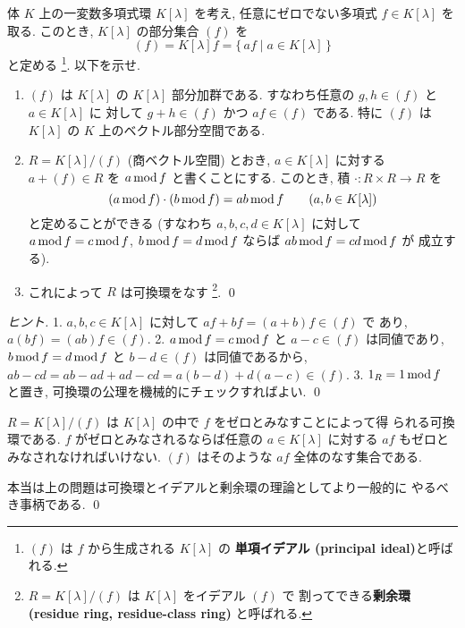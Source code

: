 \documentclass[12pt,twoside]{jarticle}
\begin{document}
\begin{question}[15点]
  \label{q:K[x]/(f)-1}
  体 $K$ 上の一変数多項式環 $K[\lambda]$ を考え, 
  任意にゼロでない多項式 $f\in K[\lambda]$ を取る.
  このとき, $K[\lambda]$ の部分集合 $(f)$ を
  \begin{equation*}
    (f) = K[\lambda]f = \{\, af \mid a\in K[\lambda]\,\}
  \end{equation*}
  と定める%
  \footnote{$(f)$ は $f$ から生成される $K[\lambda]$ の
    {\bf 単項イデアル (principal ideal)}と呼ばれる.}.  
  以下を示せ.
  \begin{enumerate}
  \item $(f)$ は $K[\lambda]$ の $K[\lambda]$ 部分加群である.
    すなわち任意の $g,h\in (f)$ と $a\in K[\lambda]$ に
    対して $g+h\in (f)$ かつ $af\in (f)$ である.
    特に $(f)$ は $K[\lambda]$ の $K$ 上のベクトル部分空間である.
  \item $R=K[\lambda]/(f)$ (商ベクトル空間) とおき,
    $a\in K[\lambda]$ に対する $a+(f)\in R$ を $a\mathop{\mathrm{mod}}\nolimits f$ と書くことにする.
    このとき, 積 $\cdot:R\times R\to R$ を
    \begin{equation*}
      (a\mathop{\mathrm{mod}}\nolimits f)\cdot(b\mathop{\mathrm{mod}}\nolimits f) = ab\mathop{\mathrm{mod}}\nolimits f
      \qquad (a,b\in K[\lambda])
    \end{equation*}
    と定めることができる
    (すなわち $a,b,c,d\in K[\lambda]$ に対して %
    $a\mathop{\mathrm{mod}}\nolimits f=c\mathop{\mathrm{mod}}\nolimits f$, $b\mathop{\mathrm{mod}}\nolimits f=d\mathop{\mathrm{mod}}\nolimits f$ ならば $ab\mathop{\mathrm{mod}}\nolimits f=cd\mathop{\mathrm{mod}}\nolimits f$ が
    成立する).
  \item これによって $R$ は可換環をなす%
    \footnote{$R=K[\lambda]/(f)$ は $K[\lambda]$ をイデアル $(f)$ で
      割ってできる{\bf 剰余環 (residue ring, residue-class ring)} と呼ばれる.}.
    \qed
  \end{enumerate}
\end{question}

\begin{proof}[ヒント]
  1. $a,b,c\in K[\lambda]$ に対して $af+bf=(a+b)f\in(f)$ で
  あり, $a(bf) = (ab)f\in(f)$. 
  2. $a\mathop{\mathrm{mod}}\nolimits f=c\mathop{\mathrm{mod}}\nolimits f$ と $a-c\in(f)$ は同値であり,
  $b\mathop{\mathrm{mod}}\nolimits f=d\mathop{\mathrm{mod}}\nolimits f$ と $b-d\in(f)$ は同値であるから,
  $ab-cd=ab-ad+ad-cd=a(b-d)+d(a-c)\in(f)$.
  3. $1_R=1\mathop{\mathrm{mod}}\nolimits f$ と置き, 可換環の公理を機械的にチェックすればよい.
  \qed
\end{proof}

\begin{guide}
  $R=K[\lambda]/(f)$ は $K[\lambda]$ の中で $f$ をゼロとみなすことによって得
  られる可換環である.  $f$ がゼロとみなされるならば任意の $a\in K[\lambda]$ 
  に対する $af$ もゼロとみなされなければいけない.
  $(f)$ はそのような $af$ 全体のなす集合である.

  本当は上の問題は可換環とイデアルと剰余環の理論としてより一般的に
  やるべき事柄である.
  \qed
\end{guide}
\end{document}
